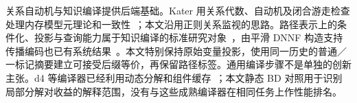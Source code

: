 关系自动机与知识编译提供后端基础。Kater 用关系代数、自动机及闭合游走检查处理内存模型元理论和一致性~\cite{kater2023}；本文沿用正则关系监视的思路。路径表示上的条件化、投影与查询能力属于知识编译的标准研究对象~\cite{darwiche2002}，由平滑 DNNF 构造支持传播编码也已有系统结果~\cite{kucera2021}。本文特别保持原始变量投影，使用同一历史的普通／一标记摘要建立可接受后缀等价，再保留路径标签。通用编译步骤不是单独的创新主张。d4 等编译器已经利用动态分解和组件缓存~\cite{lagniez2017}；本文静态 BD 对照用于识别局部分解对收益的解释范围，没有与这些成熟编译器在相同任务上作性能排名。
